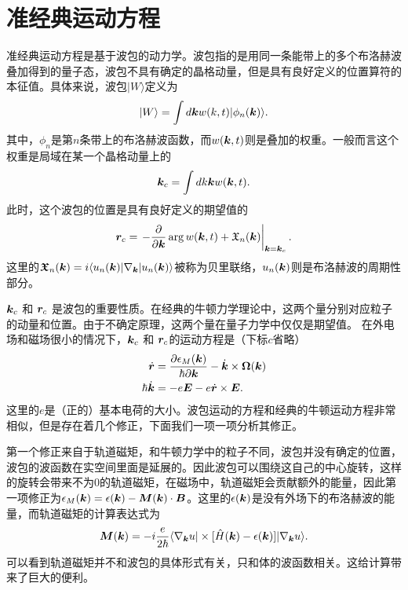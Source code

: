 \section{准经典运动方程}

准经典运动方程是基于波包的动力学。波包指的是用同一条能带上的多个布洛赫波叠加得到的量子态，波包不具有确定的晶格动量，但是具有良好定义的位置算符的本征值。具体来说，波包$|W\rangle$定义为
\begin{equation}
|W\rangle=\int d\boldsymbol{k} w(k, t)|\phi_n(\boldsymbol{k})\rangle.
\end{equation}
其中，$\phi_n$是第$n$条带上的布洛赫波函数，而$w(\boldsymbol{k},t)$则是叠加的权重。一般而言这个权重是局域在某一个晶格动量上的
\begin{equation}
\boldsymbol{k}_c = \int dk \boldsymbol{k} w(\boldsymbol{k},t).
\end{equation}
此时，这个波包的位置是具有良好定义的期望值的
\begin{equation}
\boldsymbol{r}_c = \left. -\frac{\partial}{\partial \boldsymbol{k}} \arg w(\boldsymbol{k}, t) + \mathfrak{X}_n(\boldsymbol{k})\right|_{\boldsymbol{k}=\boldsymbol{k}_c}.\label{semi-rc}
\end{equation}
这里的$\boldsymbol{\mathfrak{X}}_n(\boldsymbol{k})=i \langle u_n(\boldsymbol{k})|\nabla_{\boldsymbol{k}}|u_n(\boldsymbol{k}) \rangle$被称为贝里联络，$u_n(\boldsymbol{k})$则是布洛赫波的周期性部分。

$\boldsymbol{k}_c$ 和 $\boldsymbol{r}_c$ 是波包的重要性质。在经典的牛顿力学理论中，这两个量分别对应粒子的动量和位置。由于不确定原理，这两个量在量子力学中仅仅是期望值。 在外电场和磁场很小的情况下，$\boldsymbol{k}_c$ 和 $\boldsymbol{r}_c$的运动方程是（下标$c$省略）
\begin{align}
	\dot{\boldsymbol{r}} &= \frac{\partial \epsilon_M(\boldsymbol{k})}{\hbar\partial \boldsymbol{k}}-\dot{\boldsymbol{k}}\times\boldsymbol{\Omega}(\boldsymbol{k})\nonumber\\
	\hbar\dot{\boldsymbol{k}} &= -e\boldsymbol{E}-e\dot{\boldsymbol{r}}\times\boldsymbol{E}.\label{semi-eqn}
\end{align}
这里的$e$是（正的）基本电荷的大小。波包运动的方程和经典的牛顿运动方程非常相似，但是存在着几个修正，下面我们一项一项分析其修正。

第一个修正来自于轨道磁矩，和牛顿力学中的粒子不同，波包并没有确定的位置，波包的波函数在实空间里面是延展的。因此波包可以围绕这自己的中心旋转，这样的旋转会带来不为0的轨道磁矩，在磁场中，轨道磁矩会贡献额外的能量，因此第一项修正为$\epsilon_M(\boldsymbol{k})=\epsilon(\boldsymbol{k})-\boldsymbol{M}(\boldsymbol{k})\cdot\boldsymbol{B}$。这里的$\epsilon(\boldsymbol{k})$是没有外场下的布洛赫波的能量，而轨道磁矩的计算表达式为
\begin{equation}
\boldsymbol{M}(\boldsymbol{k}) = -i\frac{e}{2\hbar}\langle\nabla_{\boldsymbol{k}}u|\times [\hat{H}(\boldsymbol{k})-\epsilon(\boldsymbol{k})]|\nabla_{\boldsymbol{k}}u\rangle.
\end{equation}
可以看到轨道磁矩并不和波包的具体形式有关，只和体的波函数相关。这给计算带来了巨大的便利。

